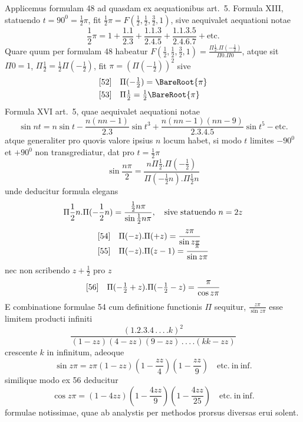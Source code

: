 Applicemus formulam 48 ad quasdam ex aequationibus art.\ 5.
Formula XIII, statuendo $t=90^0=\frac12\pi$, fit
$\frac12\pi=F(\frac12,\frac12,\frac32,1)$, sive aequivalet aequationi notae
\[
\frac12\pi=1+\frac{1.1}{2.3}+\frac{1.1.3}{2.4.5}
+\frac{1.1.3.5}{2.4.6.7}+\mathrm{etc.}
\]
Quare quum per formulam 48 habeatur
$F(\frac12,\frac12,\frac32,1)=\frac{\Pi\frac12.\Pi(-\frac12)}{\Pi0.\Pi0}$,
atque sit $\Pi0=1$, $\Pi\frac12=\frac12\Pi(-\frac12)$, fit
$\pi=(\Pi(-\frac12))^2$ sive
\[
\begin{array}{@{}ll@{}}
[52]&\displaystyle\Pi(-\tfrac12)=\BareRoot{\pi}\\[3pt]
[53]&\displaystyle\Pi\tfrac12=\tfrac12\BareRoot{\pi}
\end{array}
\]
Formula XVI art.\ 5, quae aequivalet aequationi notae
\[
\sin nt=n\sin t-\frac{n(nn-1)}{2.3}\sin t^3
+\frac{n(nn-1)(nn-9)}{2.3.4.5}\sin t^5-\mathrm{etc.}
\]
atque generaliter pro quovis valore ipsius $n$ locum habet, si modo
$t$ limites $-90^0$ et $+90^0$ non transgrediatur, dat pro $t=\frac12\pi$
\[
\sin\frac{n\pi}{2}=
\frac{n\Pi\frac12.\Pi(-\frac12)}{\Pi(-\frac12n).\Pi\frac12n}
\]
unde deducitur formula elegans
\[
\Pi\frac12n.\Pi(-\frac12n)=\frac{\frac12n\pi}{\sin\frac12n\pi},
\quad\hbox{sive statuendo }n=2z
\]
\[
\begin{array}{@{}ll@{}}
[54]&\displaystyle\Pi(-z).\Pi(+z)=\frac{z\pi}{\sin z\pi}\\[3pt]
[55]&\displaystyle\Pi(-z).\Pi(z-1)=\frac{\pi}{\sin z\pi}
\end{array}
\]
nec non scribendo $z+\frac12$ pro $z$
\[
\begin{array}{@{}ll@{}}
[56]&\displaystyle\Pi(-\tfrac12+z).\Pi(-\tfrac12-z)=\frac{\pi}{\cos z\pi}
\end{array}
\]
E combinatione formulae 54 cum definitione functionis $\Pi$ sequitur,
$\frac{z\pi}{\sin z\pi}$ esse limitem producti infiniti
\[
\frac{(1.2.3.4\,.\,.\,.\,.k)^2}
{(1-zz)(4-zz)(9-zz)\,.\,.\,.\,.(kk-zz)}
\]
crescente $k$ in infinitum, adeoque
\[
\sin z\pi=z\pi(1-zz)(1-\frac{zz}{4})(1-\frac{zz}{9})\quad
\mathrm{etc.\ in\ inf.}
\]
similique modo ex 56 deducitur
\[
\cos z\pi=(1-4zz)(1-\frac{4zz}{9})(1-\frac{4zz}{25})\quad
\mathrm{etc.\ in\ inf.}
\]
formulae notissimae, quae ab analystis per methodos prorsus diversas
erui solent.

